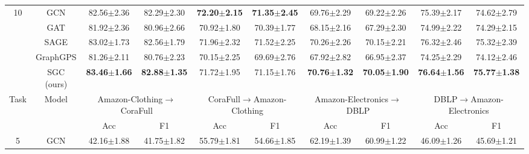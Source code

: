 \begin{table*}[ht]
{\begin{tabular}{@{}c|c|cccccccc@{}}
\multirow{5}{*}{10}   & GCN                       & 82.56$\pm$2.36                    & 82.29$\pm$2.30                    & \textbf{72.20$\pm$2.15}           & \textbf{71.35$\pm$2.45}           & 69.76$\pm$2.29                    & 69.22$\pm$2.26                   & 75.39$\pm$2.17                    & 74.62$\pm$2.79                   \\
                      & GAT                       & 81.92$\pm$2.36                    & 80.96$\pm$2.66                    & 70.92$\pm$1.80                    & 70.39$\pm$1.77                    & 68.15$\pm$2.16                    & 67.29$\pm$2.30                   & 74.99$\pm$2.22                    & 74.29$\pm$2.15                   \\
                      & SAGE                      & 83.02$\pm$1.73                    & 82.56$\pm$1.79                    & 71.96$\pm$2.32                    & 71.52$\pm$2.25                    & 70.26$\pm$2.26                    & 70.15$\pm$2.21                   & 76.32$\pm$2.46                    & 75.32$\pm$2.39                   \\
                      & GraphGPS                  & 81.26$\pm$2.11                    & 80.76$\pm$2.23                    & 70.15$\pm$2.25                    & 69.69$\pm$2.76                    & 67.92$\pm$2.82                    & 66.95$\pm$2.37                   & 74.25$\pm$2.29                    & 74.12$\pm$2.46                   \\
                      & SGC (ours)                & \textbf{83.46$\pm$1.66}           & \textbf{82.88$\pm$1.35}           & 71.72$\pm$1.95                    & 71.15$\pm$1.76                    & \textbf{70.76$\pm$1.32}           & \textbf{70.05$\pm$1.90}          & \textbf{76.64$\pm$1.56}           & \textbf{75.77$\pm$1.38}          \\ \midrule
\multirow{2}{*}{Task} & \multirow{2}{*}{Model}    & \multicolumn{2}{c}{Amazon-Clothing$\rightarrow$CoraFull} & \multicolumn{2}{c}{CoraFull$\rightarrow$Amazon-Clothing} & \multicolumn{2}{c}{Amazon-Electronics$\rightarrow$DBLP} & \multicolumn{2}{c}{DBLP$\rightarrow$Amazon-Electronics} \\ \cmidrule(l){3-10} 
                      &                           & Acc                      & F1                       & Acc                      & F1                       & Acc                      & F1                      & Acc                      & F1                      \\ \midrule
\multirow{5}{*}{5}    & GCN                       & 42.16$\pm$1.88                    & 41.75$\pm$1.82                    & 55.79$\pm$1.81                    & 54.66$\pm$1.85                    & 62.19$\pm$1.39                    & 60.99$\pm$1.22                   & 46.09$\pm$1.26                    & 45.69$\pm$1.21                   \\

\end{tabular}}
\end{table*}
